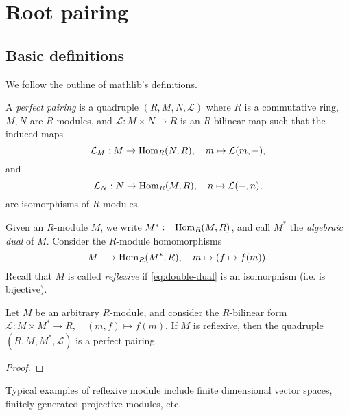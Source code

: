 \chapter{Root pairing}
\label{cha:root-pairing}
\section{Basic definitions}
\label{sec:basic-definitions}

We follow the outline of mathlib's definitions. 

\begin{definition}
    \label{def:perfect-pairing}
    \leanok
    A {\it perfect pairing} is a quadruple $(R,M,N,\mathcal{L})$ where $R$ is a commutative ring, $M,N$ are 
    $R$-modules, and $\mathcal{L} : M \times N \to R$ is an $R$-bilinear map such that the induced maps
    \[
        \mathcal{L}_M : M \to {\rm Hom}_R(N,R), \quad m \mapsto \mathcal{L}(m,-),
    \]
    and 
    \[
        \mathcal{L}_N : N \to {\rm Hom}_R(M,R), \quad n \mapsto \mathcal{L}(-,n),
    \]
    are isomorphisms of $R$-modules.
\end{definition}
Given an $R$-module $M$, we write $M^* := {\rm Hom}_R(M,R)$, and call $M^*$ the 
{\it algebraic dual} of $M$. Consider the $R$-module homomorphisms
\begin{equation}\label{eq:double-dual}
    M \longrightarrow {\rm Hom}_R(M^*,R), \quad m \mapsto (f \mapsto f(m)).
\end{equation}
Recall that $M$ is called {\it reflexive} if \eqref{eq:double-dual} is an isomorphism 
(i.e. is bijective). 
\begin{lemma}\label{lem:reflexive-perf-pairing}
    Let $M$ be an arbitrary $R$-module, and consider the $R$-bilinear form 
    $\mathcal{L} : M \times M^* \to R, \quad (m,f) \mapsto f(m)$. If $M$ is reflexive, then the
    quadruple $(R,M, M^*, \mathcal{L})$ is a perfect pairing.
\end{lemma}
\begin{proof}

\end{proof}
Typical examples of reflexive module include finite dimensional vector spaces, finitely 
generated projective modules, etc. 



